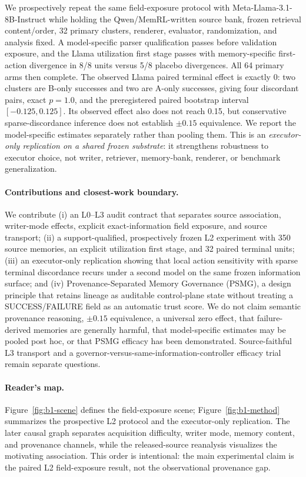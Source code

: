 We prospectively repeat the same field-exposure protocol with Meta-Llama-3.1-8B-Instruct while holding the Qwen/MemRL-written source bank, frozen retrieval content/order, 32 primary clusters, renderer, evaluator, randomization, and analysis fixed. A model-specific parser qualification passes before validation exposure, and the Llama utilization first stage passes with memory-specific first-action divergence in 8/8 units versus 5/8 placebo divergences. All 64 primary arms then complete. The observed Llama paired terminal effect is exactly $0$: two clusters are B-only successes and two are A-only successes, giving four discordant pairs, exact $p=1.0$, and the preregistered paired bootstrap interval $[-0.125,0.125]$. Its observed effect also does not reach 0.15, but conservative sparse-discordance inference does not establish $\pm0.15$ equivalence. We report the model-specific estimates separately rather than pooling them. This is an \emph{executor-only replication on a shared frozen substrate}: it strengthens robustness to executor choice, not writer, retriever, memory-bank, renderer, or benchmark generalization.

\paragraph{Contributions and closest-work boundary.}
We contribute (i) an L0--L3 audit contract that separates source association, writer-mode effects, explicit exact-information field exposure, and source transport; (ii) a support-qualified, prospectively frozen L2 experiment with 350 source memories, an explicit utilization first stage, and 32 paired terminal units; (iii) an executor-only replication showing that local action sensitivity with sparse terminal discordance recurs under a second model on the same frozen information surface; and (iv) Provenance-Separated Memory Governance (PSMG), a design principle that retains lineage as auditable control-plane state without treating a SUCCESS/FAILURE field as an automatic trust score. We do not claim semantic provenance reasoning, $\pm0.15$ equivalence, a universal zero effect, that failure-derived memories are generally harmful, that model-specific estimates may be pooled post hoc, or that PSMG efficacy has been demonstrated. Source-faithful L3 transport and a governor-versus-same-information-controller efficacy trial remain separate questions.

\paragraph{Reader's map.} Figure~\ref{fig:b1-scene} defines the field-exposure scene; Figure~\ref{fig:b1-method} summarizes the prospective L2 protocol and the executor-only replication. The later causal graph separates acquisition difficulty, writer mode, memory content, and provenance channels, while the released-source reanalysis visualizes the motivating association. This order is intentional: the main experimental claim is the paired L2 field-exposure result, not the observational provenance gap.
